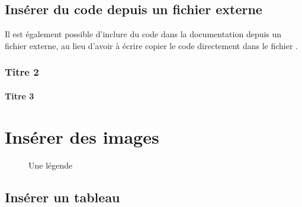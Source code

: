 \documentclass[a4,10pt,french]{sphinxmanual}
\begin{document}
\subsection{Insérer du code depuis un fichier externe}
\label{\detokenize{tutoriel-sphinx/inserer-code:inserer-du-code-depuis-un-fichier-externe}}
\sphinxAtStartPar
Il est également possible d’inclure du code dans la documentation depuis un fichier externe, au lieu d’avoir à écrire copier le code directement dans le fichier .

%
\begin{sphinxVerbatim}[commandchars=\\\{\},numbers=left,firstnumber=1,stepnumber=1]
   


\end{sphinxVerbatim}
\sphinxresetverbatimhllines


\subsubsection{Titre 2}
\label{\detokenize{tutoriel-sphinx/inserer-code:titre-2}}

\paragraph{Titre 3}
\label{\detokenize{tutoriel-sphinx/inserer-code:titre-3}}

\section{Insérer des images}
\label{\detokenize{tutoriel-sphinx/inserer-figures:inserer-des-images}}\label{\detokenize{tutoriel-sphinx/inserer-figures:chapter-insert-images}}\label{\detokenize{tutoriel-sphinx/inserer-figures::doc}}
\begin{figure}[htbp]
\centering
\capstart

\noindent{}
\caption{Une légende}\label{\detokenize{tutoriel-sphinx/inserer-figures:id1}}\end{figure}


\subsection{Insérer un tableau}
\label{\detokenize{tutoriel-sphinx/inserer-figures:inserer-un-tableau}}
\end{document}
